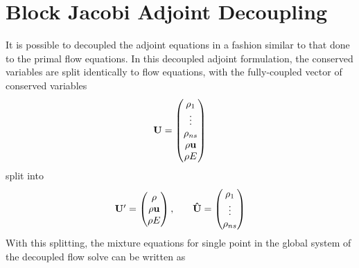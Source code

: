 \section{Block Jacobi Adjoint Decoupling}

It is possible to decoupled the adjoint equations in a fashion similar to that
done to the primal flow equations.  In this decoupled adjoint formulation, the
conserved variables are split identically to flow equations, with the
fully-coupled vector of conserved variables
\begin{equation}
	\mathbf U =
  \begin{pmatrix}
 		\rho_1    \\
		\vdots    \\
		\rho_{ns} \\
    \rho \mathbf u  \\
		\rho E    \\
	\end{pmatrix}
  \label{all-vars}
 \end{equation}
 split into
\begin{equation}
	\begin{matrix}
		\mathbf{U}'=\begin{pmatrix}
			\rho \\
			\rho \mathbf u \\
			\rho E
		\end{pmatrix},\quad &
		\mathbf{\hat{U}}=\begin{pmatrix}
			\rho_1 \\
			\vdots \\
			\rho_{ns}
		\end{pmatrix}
	\end{matrix}
  \label{dc-vars}
\end{equation}
With this splitting, the mixture equations for single point in the global system
of the decoupled flow solve can be written as
